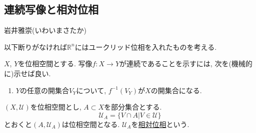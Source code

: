 \documentclass[dvipdfmx,a4paper,11pt]{article}
\newcommand{\R}{\mathbb{R}}
\theoremstyle{definition}
\begin{document}
\begin{enumerate}[label=\textbf{問}\ref*{sec-subspace}.\arabic*]

\end{enumerate}		
\newpage





\begin{center}
\section{連続写像と相対位相}
\label{sec-conti}
\end{center}

\begin{flushright}
 岩井雅崇(いわいまさたか)
\end{flushright}

以下断りがなければ$\R^n$にはユークリッド位相を入れたものを考える. 

   \begin{tcolorbox}[
    colback = white,
    colframe = green!35!black,
    fonttitle = \bfseries,
    breakable = true]
$X$, $Y$を位相空間とする.  写像$f : X \to Y$が連続であることを示すには, 次を(機械的に)示せば良い.
\begin{enumerate}
\setlength{\parskip}{0cm}
  \setlength{\itemsep}{0pt} 
\item $Y$の任意の開集合$V_{Y}$について, $f^{-1}(V_{Y})$が$X$の開集合になる. 
\end{enumerate}
 \end{tcolorbox}

 \begin{tcolorbox}[
    colback = white,
    colframe = green!35!black,
    fonttitle = \bfseries,
    breakable = true]
$(X,\mathscr{U})$を位相空間とし, $A\subset X$を部分集合とする. 
$$
\mathscr{U}_ A= \{V \cap A | V \in  \mathscr{U}\}
$$
とおくと$(A,\mathscr{U}_ A)$は位相空間となる. $\mathscr{U}_ A$を\underline{相対位相}という.
 \end{tcolorbox}
\end{document}
